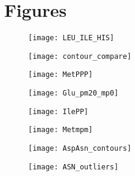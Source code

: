 \section{Figures}

\begin{figure}[h]
  \centering
  \texttt{[image: LEU\_ILE\_HIS]}
  \caption{\FigOneCaption}
    \label{fig:outcontour}
\end{figure}



\begin{figure}[h]
  \centering
  \texttt{[image: contour\_compare]}
  \caption{\FigTwoCaption}
    \label{fig:contour_compare}
\end{figure}



\begin{figure}[h]
  \centering
  \texttt{[image: MetPPP]}
  \caption{\FigThreeCaption}
    \label{fig:2bmo}
\end{figure}



\begin{figure}[h]
  \centering
  \texttt{[image: Glu\_pm20\_mp0]}
\caption{\FigFourCaption}
\label{fig:Glupm20_mp0}
\vspace{-10pt}
\end{figure}


\begin{figure}[h]
  \centering
  \texttt{[image: IlePP]}
\caption{\FigFiveCaption}
\label{fig:Ilepp}
\vspace{-10pt}
\end{figure}


\begin{figure}[h]
  \centering
  \texttt{[image: Metmpm]}
\caption{\FigSixCaption}
\label{fig:METmpm_3d43}
\vspace{-10pt}
\end{figure}


\begin{figure}[h]
  \centering
  \texttt{[image: AspAsn\_contours]}
\caption{\FigSevenCaption}
\label{fig:AspAsn}
\vspace{-10pt}
\end{figure}



\begin{figure}[h]
  \centering
  \texttt{[image: ASN\_outliers]}
\caption{\FigEightCaption}
\label{fig:AsnOutliers}
\vspace{-10pt}
\end{figure}